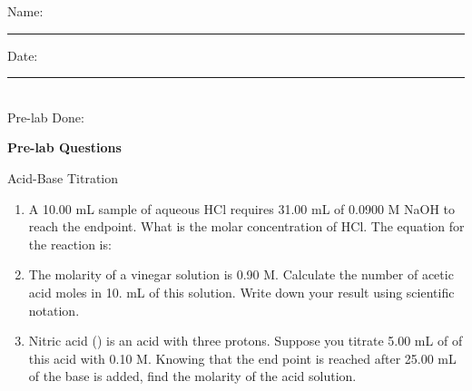 \documentclass[main.tex]{subfiles}
\begin{document}
\restoregeometry







\begin{multicols}{2}
\begin{tcolorbox}[enhanced jigsaw,breakable,size=title,
colback=mybrown!05,colframe=black,fonttitle=\bfseries,
title=STUDENT INFO,pad at break=1mm, break at=15cm/0pt ]
\vspace{0.2cm}
\noindent Name: \rule{5cm}{0.4pt}Date:\rule{1cm}{0.4pt}\\
Pre-lab Done: \quad
\end{tcolorbox}
\end{multicols}
\hfill
\vspace{0.2cm}
\begin{center}
{\large \bfseries 
Pre-lab Questions 
\par
\Huge
Acid-Base Titration
\\[5pt] \par}
\vspace{0.2cm}
\end{center}
\par
\noindent
\uline{  \hfill \normalsize \hfill       }

\begin{enumerate}
\item A 10.00 mL sample of aqueous HCl requires 31.00 mL of 0.0900 M NaOH to reach the endpoint. What is the molar concentration of HCl. The equation for the reaction is:\\
\begin{center}\end{center}\vspace{3cm}
\item The molarity of a vinegar solution is 0.90 M. Calculate the number of acetic acid moles in 10. mL of this solution. Write down your result using scientific notation.\vspace{4cm}

\item  Nitric acid () is an acid with three protons. Suppose you titrate 5.00 mL of of this acid with  0.10 M. Knowing that the end point is reached after 25.00 mL of the base is added, find the molarity of the acid solution.\vspace{4cm}




\end{enumerate}
\end{document}
